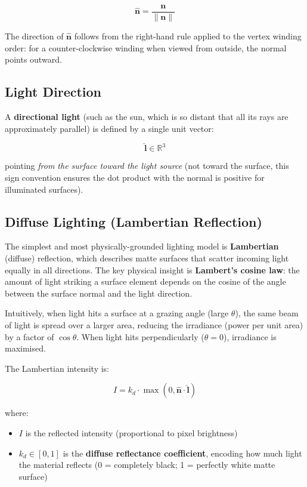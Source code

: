 \documentclass[11pt]{article}
\begin{document}
\begin{equation}
    \hat{\mathbf{n}} = \frac{\mathbf{n}}{\|\mathbf{n}\|}
\end{equation}

The direction of $\hat{\mathbf{n}}$ follows from the right-hand rule applied to the vertex winding order: for a counter-clockwise winding when viewed from outside, the normal points outward.


\subsection{Light Direction}

A \textbf{directional light} (such as the sun, which is so distant that all its rays are approximately parallel) is defined by a single unit vector:

\begin{equation}
    \hat{\mathbf{l}} \in \mathbb{R}^3
\end{equation}

pointing \emph{from the surface toward the light source} (not toward the surface, this sign convention ensures the dot product with the normal is positive for illuminated surfaces).


\subsection{Diffuse Lighting (Lambertian Reflection)}

The simplest and most physically-grounded lighting model is \textbf{Lambertian} (diffuse) reflection, which describes matte surfaces that scatter incoming light equally in all directions. The key physical insight is \textbf{Lambert's cosine law}: the amount of light striking a surface element depends on the cosine of the angle between the surface normal and the light direction.

Intuitively, when light hits a surface at a grazing angle (large $\theta$), the same beam of light is spread over a larger area, reducing the irradiance (power per unit area) by a factor of $\cos\theta$. When light hits perpendicularly ($\theta = 0$), irradiance is maximised.

The Lambertian intensity is:

\begin{equation}
    I = k_d \cdot \max(0, \hat{\mathbf{n}} \cdot \hat{\mathbf{l}})
\end{equation}

where:
\begin{itemize}
    \item $I$ is the reflected intensity (proportional to pixel brightness)
    \item $k_d \in [0, 1]$ is the \textbf{diffuse reflectance coefficient}, encoding how much light the material reflects (0 = completely black; 1 = perfectly white matte surface)
\end{itemize}
\end{document}
